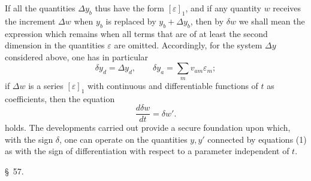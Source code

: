 \documentclass[11pt,a4paper,leqno]{article}
\begin{document}
If all the quantities $\Delta y_b$ thus have the form $[\varepsilon]_1$,
and if any quantity $w$ receives the increment $\Delta w$ when $y_b$ is
replaced by $y_b+\Delta y_b$, then by $\delta w$ we shall mean the
expression which remains when all terms that are of at least the second
dimension in the quantities $\varepsilon$ are omitted. Accordingly, for
the system $\Delta y$ considered above, one has in particular
\[
\delta y_d=\Delta y_d,\qquad
\delta y_a=\sum_m v_{am}\varepsilon_m;
\]
if $\Delta w$ is a series $[\varepsilon]_1$ with continuous and
differentiable functions of $t$ as coefficients, then the equation
\[
\frac{d\delta w}{dt}=\delta w'.
\]
holds. The developments carried out provide a secure foundation upon
which, with the sign $\delta$, one can operate on the quantities $y,y'$
connected by equations (1) as with the sign of differentiation with
respect to a parameter independent of $t$.



\begin{center}
{\large \S~57.}
\end{center}
\end{document}
